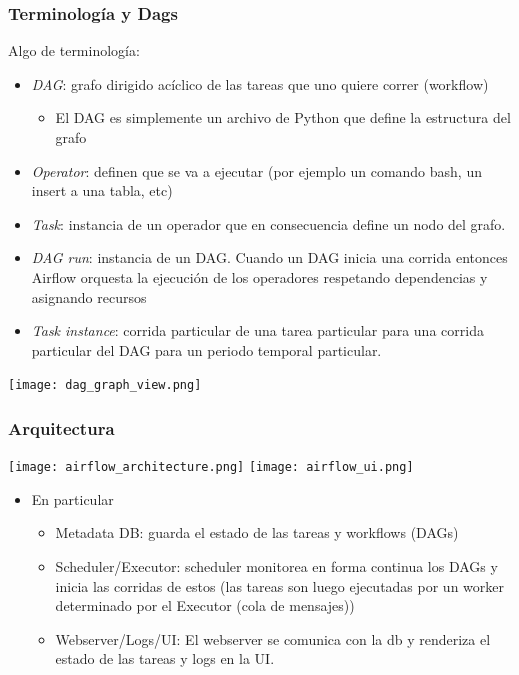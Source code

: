 \documentclass[leqno, 10pt, envcountsect]{beamer}
\numberwithin{equation}{section}
\theoremstyle{definition}
\theoremstyle{example}
\numberwithin{figure}{section}
\numberwithin{table}{section}
\let\olditem\item
\renewcommand{\item}{%
\olditem\vspace{1pt}}
\begin{document}
\begin{frame}[fragile=singleslide]
  \frametitle{Terminología y Dags}
  Algo de terminología:
  \begin{itemize}
    \item \textit{DAG}: grafo dirigido acíclico de las tareas que uno quiere
      correr (workflow)
      \begin{itemize}
        \item El DAG es simplemente un archivo de Python
          que define la estructura del grafo
      \end{itemize}
    \item \textit{Operator}: definen que se va a ejecutar (por ejemplo un comando bash, un insert a una tabla, etc)
    \item \textit{Task}: instancia de un operador que en consecuencia
      define un nodo del grafo.
    \item \textit{DAG run}: instancia de un DAG. Cuando un DAG inicia una
      corrida entonces Airflow orquesta la ejecución de los operadores
      respetando dependencias y asignando recursos
  \item \textit{Task instance}: corrida particular de una tarea particular
    para una corrida particular del DAG para un periodo temporal
      particular.
  \end{itemize}
  \begin{center}
    \texttt{[image: dag\_graph\_view.png]}
  \end{center}
\end{frame}
\begin{frame}[fragile=singleslide]
  \frametitle{Arquitectura}
  \texttt{[image: airflow\_architecture.png]}%
  \hfill
  \texttt{[image: airflow\_ui.png]}
  \begin{itemize}
    \item En particular
      \begin{itemize}
        \item Metadata DB: guarda el estado de las tareas y workflows (DAGs)
        \item Scheduler/Executor: scheduler monitorea en forma continua los DAGs y
          inicia las corridas de estos (las tareas son luego ejecutadas por un
          worker determinado por el Executor (cola de mensajes))
        \item Webserver/Logs/UI: El webserver se comunica con la db y
          renderiza el estado de las tareas y logs en la UI.
      \end{itemize}
  \end{itemize}

\end{frame}
\end{document}
